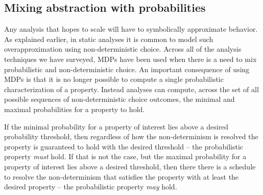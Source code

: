 \subsection{Mixing abstraction with probabilities}
Any analysis that hopes to scale will have to symbolically approximate
behavior.  As explained earlier, in static analyses it is common
to model such overapproximation using non-deterministic choice.
Across all of the analysis techniques we have surveyed, MDPs
have been used when there is a need to mix probabilistic
and non-deterministic choice.   
An important consequence of using MDPs is that it is no longer possible
to compute a single probabilistic characterization of a property.
Instead analyses can compute, across the set of all possible sequences
of non-deterministic choice outcomes, the minimal and maximal 
probabilities for a property to hold.

If the minimal probability for a property of interest lies above 
a desired probability threshold, then regardless of how the non-determinism
is resolved the property is guaranteed to hold with the desired 
threshold -- the probabilistic property \textit{must} hold.  
If that is not the case, but the maximal probability for
a property of interest lies above a desired threshold, then there
there is a schedule to resolve the non-determinism that satisfies
the property with at least the desired property -- the probabilistic property \textit{may} hold.

